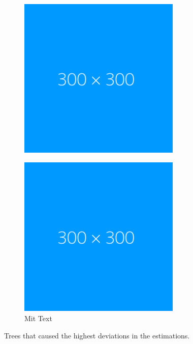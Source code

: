 \documentclass[a4paper,twoside,11pt,openright,table,draft]{article} %
\begin{document}
\begin{figure}[!htb]
\begin{subfigure}{0.32\textwidth}
		\centering
		\includegraphics[width=0.85\textwidth]{fig/dummy.png}
		\caption{}
	\end{subfigure}
	\begin{subfigure}{0.32\textwidth}
		\centering
		\includegraphics[width=0.85\textwidth]{fig/dummy.png}
		\caption{Mit Text}
	\end{subfigure}
	\caption[Difficult trees to estimate defoliation for]{\label{fig:Ur_human_img}Trees that caused the highest deviations in the estimations.}
\end{figure}
\end{document}
